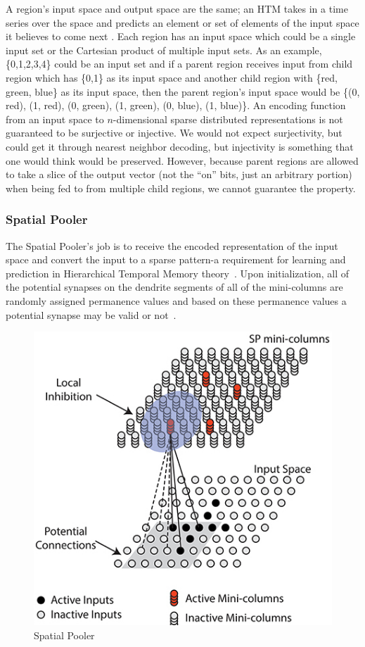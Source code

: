 \documentclass[oneside,12pt,openany]{book}
\begin{document}
	A region's input space and output space are the same; an HTM takes in a time series over the space and predicts an element or set of elements of the input space it believes to come next \cite{Purdy}. Each region has an input space which could be a single input set or the Cartesian product of multiple input sets. As an example, \{0,1,2,3,4\} could be an input set and if a parent region receives input from child region which has \{0,1\} as its input space and another child region with \{red, green, blue\} as its input space, then the parent region's input space would be \{(0, red), (1, red), (0, green), (1, green), (0, blue), (1, blue)\}. An encoding function from an input space to $n$-dimensional sparse distributed representations is not guaranteed to be surjective or injective. We would not expect surjectivity, but could get it through nearest neighbor decoding, but injectivity is something that one would think would be preserved. However, because parent regions are allowed to take a slice of the output vector (not the ``on'' bits, just an arbitrary portion) when being fed to from multiple child regions, we cannot guarantee the property.
	
	\subsubsection{Spatial Pooler}

	The Spatial Pooler's job is to receive the encoded representation of the input space and convert the input to a sparse pattern-a requirement for learning and prediction in Hierarchical Temporal Memory theory~\cite{Whitepaper}. Upon initialization, all of the potential synapses on the dendrite segments of all of the mini-columns are randomly assigned permanence values and based on these permanence values a potential synapse may be valid or not~\cite{Whitepaper}. 

	\begin{figure}[!ht]
		\centering
		\includegraphics[width=.6\linewidth]{images/SpatialPooler.jpg}
		\caption[Spatial Pooler]{Spatial Pooler \cite{TheHTMSpatialPooler}}
		\label{fig:SpatialPooler}
	\end{figure}
\end{document}
